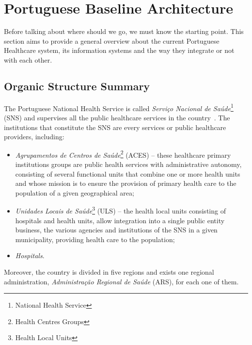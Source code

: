 \section{Portuguese Baseline Architecture}

Before talking about where should we go, we must know the starting point. This section aims to provide a general overview about the current Portuguese Healthcare system, its information systems and the way they integrate or not with each other.


\subsection{Organic Structure Summary}

The Portuguese National Health Service is called \textit{Serviço Nacional de Saúde}\footnote{National Health Service} (SNS) and supervises all the public healthcare services in the country~\citep{SAUDE2011}. The institutions that constitute the SNS are every services or public healthcare providers, including:
\begin{itemize}
\item \textit{Agrupamentos de Centros de Saúde}\footnote{Health Centres Groups} (ACES) -- these healthcare primary institutions groups are public health services with administrative autonomy, consisting of several functional units that combine one or more health units and whose mission is to ensure the provision of primary health care to the population of a given geographical area;
\item \textit{Unidades Locais de Saúde}\footnote{Health Local Units} (ULS) -- the health local units consisting of hospitals and health units, allow integration into a single public entity business, the various agencies and institutions of the SNS in a given municipality, providing health care to the population;
\item \textit{Hospitals}.
\end{itemize}

Moreover, the country is divided in five regions and exists one regional administration, \textit{A\-dminis\-tra\-ção Regional de Saúde} (ARS), for each one of them.

